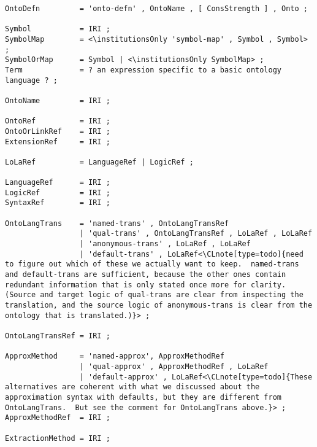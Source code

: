 \documentclass[%
\ifpretendfinal
final%
\else
draft%
\fi,
a4paper,
wd]{isov2}
\makeatletter
\newcommand*\CommentAuthor{}
\renewcommand*\CommentAuthor{#1}}
\newcommand*\CommentDate{}
\renewcommand*\CommentDate{#1}}
\newcommand*\CommentId{}
\renewcommand*\CommentId{#1}}
\newcommand*\CommentType{}
\renewcommand*\CommentType{#1}}
\newcommand*{\SetCommentColorByType}[1]{%
\edef\localType{{#1}}%
\expandafter\ifstrequal\localType{q-aut}{\colorlet{CommentColor}{red}}{%
\expandafter\ifstrequal\localType{q-all}{\colorlet{CommentColor}{orange}}{%
\expandafter\ifstrequal\localType{todo}{\colorlet{CommentColor}{orange}}{%
\expandafter\ifstrequal\localType{fyi}{\colorlet{CommentColor}{lightgray}}{%
\colorlet{CommentColor}{yellow}}}}}}
\newcommand*{\SetCommentPrefixByType}[1]{%
\edef\localType{{#1}}%
\expandafter\@ifmtarg\localType{%
\edef\CommentPrefix{}%
}{%
\caseupper[q]{#1}%
\edef\CommentPrefix{\thestring: }%
}}
\newcommand*{\initComment}[1]{%
\setkeys{Comment}{#1}%
\SetCommentColorByType{\CommentType}%
\relax%
\SetCommentPrefixByType{\CommentType}%
\relax%
}
\newcommand*{\todonote}[2][]{%
\initComment{#1}%
\pdfcomment[author=\CommentAuthor,color=CommentColor,date=\CommentDate,id=\CommentId]{%
\CommentPrefix
#2}}
\newcommand*{\todonote}[2][]{%
\initComment{#1}%
\ednote{\CommentPrefix #2}}
\newcommand*{\CLnote}[2][author=Christoph Lange]{%
\todonote[author=Christoph Lange,#1]{#2}}
\newcommand*{\institutionsOnly}{\bfseries\itshape}
\makeatother
\begin{document}
\begin{lstlisting}[language=ebnf,escapeinside={<>}]
OntoDefn         = 'onto-defn' , OntoName , [ ConsStrength ] , Onto ;
                 
Symbol           = IRI ;
SymbolMap        = <\institutionsOnly 'symbol-map' , Symbol , Symbol> ;
SymbolOrMap      = Symbol | <\institutionsOnly SymbolMap> ;
Term             = ? an expression specific to a basic ontology language ? ;
                 
OntoName         = IRI ;
                 
OntoRef          = IRI ;
OntoOrLinkRef    = IRI ;
ExtensionRef     = IRI ;
                 
LoLaRef          = LanguageRef | LogicRef ;
                 
LanguageRef      = IRI ;
LogicRef         = IRI ;
SyntaxRef        = IRI ;
                 
OntoLangTrans    = 'named-trans' , OntoLangTransRef
                 | 'qual-trans' , OntoLangTransRef , LoLaRef , LoLaRef
                 | 'anonymous-trans' , LoLaRef , LoLaRef
                 | 'default-trans' , LoLaRef<\CLnote[type=todo]{need to figure out which of these we actually want to keep.  named-trans and default-trans are sufficient, because the other ones contain redundant information that is only stated once more for clarity.  (Source and target logic of qual-trans are clear from inspecting the translation, and the source logic of anonymous-trans is clear from the ontology that is translated.)}> ;
                 
OntoLangTransRef = IRI ;
                 
ApproxMethod     = 'named-approx', ApproxMethodRef
                 | 'qual-approx' , ApproxMethodRef , LoLaRef
                 | 'default-approx' , LoLaRef<\CLnote[type=todo]{These alternatives are coherent with what we discussed about the approximation syntax with defaults, but they are different from OntoLangTrans.  But see the comment for OntoLangTrans above.}> ;
ApproxMethodRef  = IRI ;

ExtractionMethod = IRI ;
\end{lstlisting}

\end{document}
